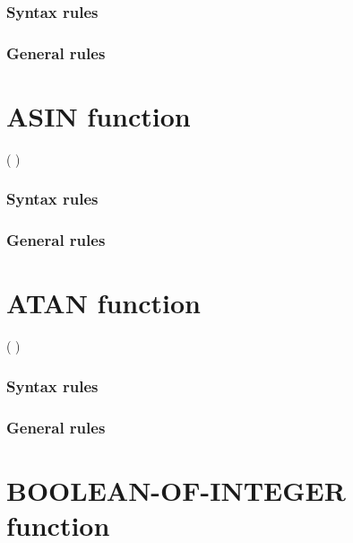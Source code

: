 \subsubsection{Syntax rules}

\subsubsection{General rules}

\section{ASIN function}

\begin{syntax}
    ( \argument )
\end{syntax}

\subsubsection{Syntax rules}

\subsubsection{General rules}

\section{ATAN function}

\begin{syntax}
    ( \argument )
\end{syntax}

\subsubsection{Syntax rules}

\subsubsection{General rules}

\section{BOOLEAN-OF-INTEGER function}

\begin{syntax}
\end{syntax}


